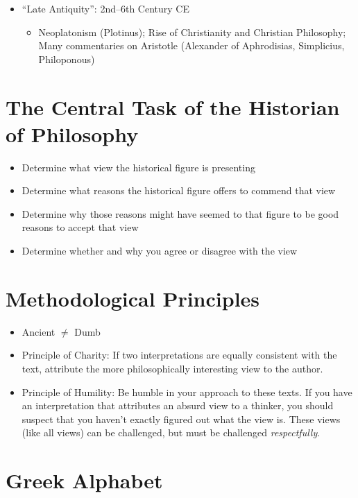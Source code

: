 \documentclass[10 pt]{article}
\begin{document}
\begin{itemize}
\begin{itemize}
\end{itemize}
\item{``Late Antiquity'': 2nd--6th Century CE}
\begin{itemize}
\item{Neoplatonism (Plotinus); Rise of Christianity and Christian Philosophy; Many commentaries on Aristotle (Alexander of Aphrodisias, Simplicius, Philoponous)}
\end{itemize}
\end{itemize}

\section*{The Central Task of the Historian of Philosophy}

\begin{itemize}
\item{Determine what view the historical figure is presenting}
\item{Determine what reasons the historical figure offers to commend that view}
\item{Determine why those reasons might have seemed to that figure to be good reasons to accept that view}
\item{Determine whether and why you agree or disagree with the view}
\end{itemize}

\section*{Methodological Principles}

\begin{itemize} 
\item{Ancient $\neq$ Dumb}
\item{Principle of Charity: If two interpretations are equally consistent with the text, attribute the more philosophically interesting view to the author.}
\item{Principle of Humility: Be humble in your approach to these texts. If you have an interpretation that attributes an absurd view to a thinker, you should suspect that you haven't exactly figured out what the view is. These views (like all views) can be challenged, but must be challenged \emph{respectfully}.}
\end{itemize}


\section*{Greek Alphabet}
\end{document}
